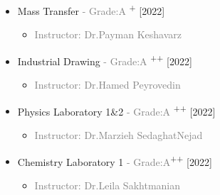 \documentclass[10pt,a4paper,sans]{moderncv} %
\begin{document}
\begin{multicols}{2}
\begin{itemize}
              \vspace{0.5 em}  
              
              	\item {} Mass Transfer  \textcolor{gray}{- Grade:A }\textsuperscript{+} \hfill[2022]
               \begin{itemize}
                \item\textcolor{gray}{Instructor: 
                {Dr.Payman Keshavarz}}
                \end{itemize}

              \vspace{0.5 em} 
              
              	\item {} Industrial Drawing \textcolor{gray}{- Grade:A }\textsuperscript{++} \hfill[2022]
               \begin{itemize}
                \item\textcolor{gray}{Instructor: 
                {Dr.Hamed Peyrovedin}}
                \end{itemize}

              \vspace{0.5 em} 

             \item {} Physics Laboratory 1\&2 \textcolor{gray}{- Grade:A }\textsuperscript{++} \hfill[2022]
               \begin{itemize}
                \item\textcolor{gray}{Instructor: 
                {Dr.Marzieh SedaghatNejad}}
                \end{itemize}  
                
			\vspace{0.5 em} 
			
			\item {} Chemistry Laboratory 1 \textcolor{gray}{- Grade:A}\textsuperscript{++} \hfill[2022]
               \begin{itemize}
                \item\textcolor{gray}{Instructor: 
                {Dr.Leila Sakhtmanian}}
                \end{itemize}
			\vspace{0.3 em} 
			\end{itemize}
			
			
	\end{multicols}
	
\end{document}
